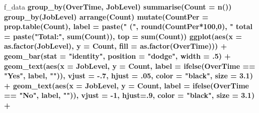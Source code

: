 \documentclass[
]{article}
\newenvironment{Shaded}{\begin{snugshade}}{\end{snugshade}}
\newcommand{\DataTypeTok}[1]{\textcolor[rgb]{0.13,0.29,0.53}{#1}}
\newcommand{\DecValTok}[1]{\textcolor[rgb]{0.00,0.00,0.81}{#1}}
\newcommand{\FloatTok}[1]{\textcolor[rgb]{0.00,0.00,0.81}{#1}}
\newcommand{\KeywordTok}[1]{\textcolor[rgb]{0.13,0.29,0.53}{\textbf{#1}}}
\newcommand{\NormalTok}[1]{#1}
\newcommand{\OperatorTok}[1]{\textcolor[rgb]{0.81,0.36,0.00}{\textbf{#1}}}
\newcommand{\StringTok}[1]{\textcolor[rgb]{0.31,0.60,0.02}{#1}}
\begin{document}
\begin{Shaded}
\begin{Highlighting}[]
\NormalTok{f_data }\OperatorTok{%
\StringTok{  }\KeywordTok{group_by}\NormalTok{(OverTime, JobLevel) }\OperatorTok{%
\StringTok{  }\KeywordTok{summarise}\NormalTok{(}\DataTypeTok{Count =} \KeywordTok{n}\NormalTok{()) }\OperatorTok{%
\StringTok{  }\KeywordTok{group_by}\NormalTok{(JobLevel) }\OperatorTok{%
\StringTok{  }\KeywordTok{arrange}\NormalTok{(Count) }\OperatorTok{%
\StringTok{  }\KeywordTok{mutate}\NormalTok{(}\DataTypeTok{CountPer =} \KeywordTok{prop.table}\NormalTok{(Count), }
    \DataTypeTok{label =} \KeywordTok{paste}\NormalTok{(}\StringTok{" ("}\NormalTok{, }\KeywordTok{round}\NormalTok{(CountPer}\OperatorTok{*}\DecValTok{100}\NormalTok{,}\DecValTok{0}\NormalTok{), }\StringTok{"%
    \DataTypeTok{total =} \KeywordTok{paste}\NormalTok{(}\StringTok{"Total:"}\NormalTok{, }\KeywordTok{sum}\NormalTok{(Count)),}
    \DataTypeTok{top =} \KeywordTok{sum}\NormalTok{(Count)) }\OperatorTok{%
\StringTok{  }\KeywordTok{ggplot}\NormalTok{(}\KeywordTok{aes}\NormalTok{(}\DataTypeTok{x =} \KeywordTok{as.factor}\NormalTok{(JobLevel), }\DataTypeTok{y =}\NormalTok{ Count, }\DataTypeTok{fill =} \KeywordTok{as.factor}\NormalTok{(OverTime))) }\OperatorTok{+}
\StringTok{  }\KeywordTok{geom_bar}\NormalTok{(}\DataTypeTok{stat =} \StringTok{"identity"}\NormalTok{, }\DataTypeTok{position =} \StringTok{"dodge"}\NormalTok{, }\DataTypeTok{width =} \FloatTok{.5}\NormalTok{) }\OperatorTok{+}
\StringTok{  }\KeywordTok{geom_text}\NormalTok{(}\KeywordTok{aes}\NormalTok{(}\DataTypeTok{x =}\NormalTok{ JobLevel, }\DataTypeTok{y =}\NormalTok{ Count, }
    \DataTypeTok{label =} \KeywordTok{ifelse}\NormalTok{(OverTime }\OperatorTok{==}\StringTok{ "Yes"}\NormalTok{, label, }\StringTok{""}\NormalTok{)),}
    \DataTypeTok{vjust =} \FloatTok{-.7}\NormalTok{, }\DataTypeTok{hjust =} \FloatTok{.05}\NormalTok{, }\DataTypeTok{color =} \StringTok{"black"}\NormalTok{, }\DataTypeTok{size =} \FloatTok{3.1}\NormalTok{) }\OperatorTok{+}
\StringTok{  }\KeywordTok{geom_text}\NormalTok{(}\KeywordTok{aes}\NormalTok{(}\DataTypeTok{x =}\NormalTok{ JobLevel, }\DataTypeTok{y =}\NormalTok{ Count, }
    \DataTypeTok{label =} \KeywordTok{ifelse}\NormalTok{(OverTime }\OperatorTok{==}\StringTok{ "No"}\NormalTok{, label, }\StringTok{""}\NormalTok{)),}
    \DataTypeTok{vjust =} \DecValTok{-1}\NormalTok{, }\DataTypeTok{hjust=}\NormalTok{.}\DecValTok{9}\NormalTok{, }\DataTypeTok{color =} \StringTok{"black"}\NormalTok{, }\DataTypeTok{size =} \FloatTok{3.1}\NormalTok{) }\OperatorTok{+}
}}}}}}}
\end{Highlighting}
\end{Shaded}
\end{document}
